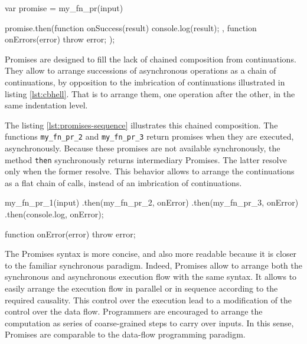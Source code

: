 \begin{code}[js, %
             caption={Example of a promise}, %
             label={lst:then}] %
var promise = my_fn_pr(input)

promise.then(function onSuccess(result) {
  console.log(result);
}, function onErrors(error) {
  throw error;
});
\end{code}

Promises are designed to fill the lack of chained composition from continuations.
They allow to arrange successions of asynchronous operations as a chain of continuations, by opposition to the imbrication of continuations illustrated in listing \ref{lst:cbhell}.
That is to arrange them, one operation after the other, in the same indentation level.

The listing \ref{lst:promises-sequence} illustrates this chained composition.
The functions \texttt{my_fn_pr_2} and \texttt{my_fn_pr_3} return promises when they are executed, asynchronously.
Because these promises are not available synchronously, the method \texttt{then} synchronously returns intermediary Promises.
The latter resolve only when the former resolve.
This behavior allows to arrange the continuations as a flat chain of calls, instead of an imbrication of continuations.

\begin{code}[js, %
             caption={A chain of Promises is more concise than an imbrication of continuations}, %
             label={lst:promises-sequence}] %
my_fn_pr_1(input)
.then(my_fn_pr_2, onError)
.then(my_fn_pr_3, onError)
.then(console.log, onError);

function onError(error) {
  throw error;
}
\end{code}

The Promises syntax is more concise, and also more readable because it is closer to the familiar synchronous paradigm.
Indeed, Promises allow to arrange both the synchronous and asynchronous execution flow with the same syntax.
It allows to easily arrange the execution flow in parallel or in sequence according to the required causality.
This control over the execution lead to a modification of the control over the data flow.
Programmers are encouraged to arrange the computation as series of coarse-grained steps to carry over inputs.
In this sense, Promises are comparable to the data-flow programming paradigm.

